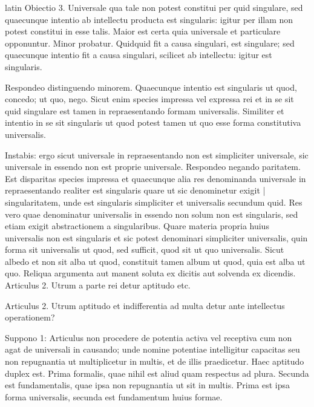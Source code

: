 \begin{otherlanguage*}{latin}
\pstart
Obiectio 3. Universale qua tale non potest constitui per quid singulare, sed quaecunque intentio ab intellectu producta est singularis:
igitur per illam non potest constitui in esse talis. Maior est certa quia universale et particulare opponuntur. Minor probatur. Quidquid fit a causa singulari, est singulare; sed quaecunque intentio fit a causa singulari, scilicet ab intellectu:
igitur est singularis. 
\pend

\pstart
Respondeo distinguendo minorem. Quaecunque intentio est singularis ut quod, concedo; ut quo, nego. Sicut enim species impressa vel expressa rei et in se sit quid singulare est tamen in repraesentando formam universalis. Similiter et intentio in se sit singularis ut quod potest tamen ut quo esse forma constitutiva universalis. 
\pend

\pstart
Instabis:
ergo sicut universale in repraesentando non est simpliciter universale, sic universale in essendo non est proprie universale. Respondeo negando paritatem. Est disparitas species impressa et quaecunque alia res denominanda universale in repraesentando realiter est singularis quare ut sic denominetur exigit \textnormal{|} singularitatem, unde est singularis simpliciter et universalis secundum quid. Res vero quae denominatur universalis in essendo non solum non est singularis, sed etiam exigit abstractionem a singularibus. Quare materia propria huius universalis non est singularis et sic potest denominari simpliciter universalis, quin forma sit universalis ut quod, sed sufficit, quod sit ut quo universalis. Sicut albedo et non sit alba ut quod, constituit tamen album ut quod, quia est alba ut quo. Reliqua argumenta aut manent soluta ex dicitis aut solvenda ex dicendis. Articulus 2. Utrum a parte rei detur aptitudo etc. 
\pend

\pstart
{}
\pend

\pstart
\noindent%
Articulus 2. Utrum aptitudo et indifferentia ad multa detur ante intellectus operationem? 
\pend

\pstart
Suppono 1:
Articulus non procedere de potentia activa vel receptiva cum non agat de universali in causando; unde nomine potentiae intelligitur capacitas seu non repugnantia ut multiplicetur in multis, et de illis praedicetur. Haec aptitudo duplex est. Prima formalis, quae nihil est aliud quam respectus ad plura. Secunda est fundamentalis, quae ipsa non repugnantia ut sit in multis. Prima est ipsa forma universalis, secunda est fundamentum huius formae. 
\pend


\end{otherlanguage*}
